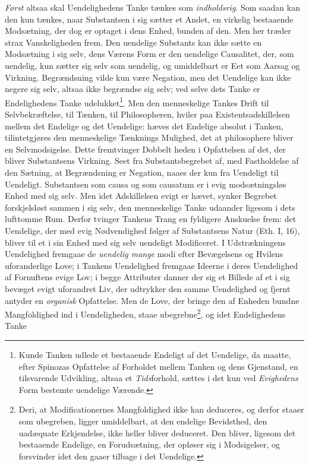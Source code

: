 \documentclass[12pt,a4paper]{book}
\newcommand{\opage}[1]{\marginnote{\footnotesize\textit{[#1]}}}
\begin{document}
\emph{Først} altsaa skal Uendelighedens Tanke tænkes som
\emph{indholdsrig}. Som saadan kan den kun tænkes, naar
Substantsen i sig sætter et Andet, en virkelig bestaaende
Modsætning, der dog er optaget i dens Enhed, bunden af
den. Men her træder strax Vanskeligheden frem. Den
uendelige Substants kan ikke sætte en Modsætning i sig
selv, dens Værens Form er den uendelige Causalitet, der,
som uendelig, kun sætter sig selv som uendelig, og umiddelbart
er Eet som Aarsag og Virkning. Begrændsning vilde
kun være Negation, men det Uendelige kan ikke negere sig
selv, altsaa ikke begrændse sig selv; ved selve dets Tanke
er Endelighedens Tanke udelukket\footnote{Kunde Tanken udlede
et bestaaende Endeligt af det Uendelige, da maatte, efter
Spinozas Opfattelse af Forholdet mellem Tanken og
dens Gjenstand, en tilsvarende Udvikling, altsaa et
\emph{Tids}forhold, sættes i det kun ved \emph{Evighedens} Form
bestemte uendelige Værende.}. Men den menneskelige
Tankes Drift til Selvbekræftelse, til Tænken, til Philosopheren,
hviler paa Existentsadskillelsen mellem det Endelige og det
Uendelige: hæves det Endelige absolut i Tanken, tilintetgjøres
den menneskelige Tænknings Mulighed, det at philosophere
bliver en Selvmodsigelse. Dette fremtvinger Dobbelt\-%
\opage{176}\setcounter{footnote}{0}%
heden i Opfattelsen af det, der bliver Substantsens Virkning.
Seet fra Substantsbegrebet af, med Fastholdelse af den
Sætning, at Begrændsning er Negation, naaes der kun fra
Uendeligt til Uendeligt. Substantsen som causa og som
causatum er i evig modsætningsløs Enhed med sig selv.
Men idet Adskillelsen evigt er hævet, synker Begrebet forskjelsløst
sammen i sig selv, den menneskelige Tanke udaander
ligesom i dets lufttomme Rum. Derfor tvinger Tankens
Trang en fyldigere Anskuelse frem: det Uendelige, der
med evig Nødvendighed følger af Substantsens Natur (Eth.
I, 16), bliver til et i sin Enhed med sig selv uendeligt
Modificeret. I Udstrækningens Uendelighed fremgaae de
\emph{uendelig mange} modi efter Bevægelsens og Hvilens uforanderlige
Love; i Tankens Uendelighed fremgaae Ideerne i
deres Uendelighed af Fornuftens evige Lov; i begge Attributer
danner der sig et Billede af et i sig bevæget evigt
uforandret Liv, der udtrykker den samme Uendelighed og
fjernt antyder en \emph{organisk} Opfattelse. Men de Love, der
bringe den af Enheden bundne Mangfoldighed ind i Uendeligheden,
staae ubegrebne\footnote{Deri, at Modificationernes
Mangfoldighed ikke kan deduceres, og derfor staaer som
ubegreben, ligger umiddelbart, at den endelige Bevidsthed,
den uadæquate Erkjendelse, ikke heller bliver deduceret.
Den bliver, ligesom det bestaaende Endelige, en Forudsætning,
der opløser sig i Modsigelser, og forsvinder idet den
gaaer tilbage i det Uendelige.}, og idet Endelighedens Tanke
\end{document}
